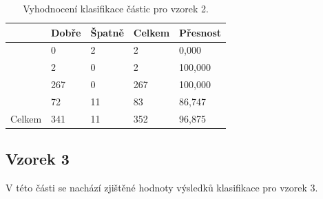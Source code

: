 \documentclass[11pt,twoside,a4paper,table]{book}
\begin{document}
\begin{table}[h]
\begin{center}
\begin{tabular}{lllll}
\rowcolor[HTML]{9B9B9B} 
\multicolumn{1}{|l|}{\cellcolor[HTML]{9B9B9B}Třída} & \multicolumn{1}{l|}{\cellcolor[HTML]{9B9B9B}Dobře} & \multicolumn{1}{l|}{\cellcolor[HTML]{9B9B9B}Špatně}  & \multicolumn{1}{l|}{\cellcolor[HTML]{9B9B9B}Celkem} & \multicolumn{1}{l|}{\cellcolor[HTML]{9B9B9B}Přesnost} \\ \hline
\multicolumn{1}{|l|}{}                              & \multicolumn{1}{l|}{0}                             & \multicolumn{1}{l|}{2}                               & \multicolumn{1}{l|}{2}                              & \multicolumn{1}{l|}{0,000}                            \\ \hline
\multicolumn{1}{|l|}{}                              & \multicolumn{1}{l|}{2}                             & \multicolumn{1}{l|}{0}                               & \multicolumn{1}{l|}{2}                              & \multicolumn{1}{l|}{100,000}                          \\ \hline
\multicolumn{1}{|l|}{}                              & \multicolumn{1}{l|}{267}                           & \multicolumn{1}{l|}{0}                               & \multicolumn{1}{l|}{267}                            & \multicolumn{1}{l|}{100,000}                          \\ \hline
\multicolumn{1}{|l|}{}                              & \multicolumn{1}{l|}{72}                            & \multicolumn{1}{l|}{11}                              & \multicolumn{1}{l|}{83}                             & \multicolumn{1}{l|}{86,747}                           \\ \hline
\multicolumn{1}{|l|}{Celkem}                        & \multicolumn{1}{l|}{341}                           & \multicolumn{1}{l|}{11}                              & \multicolumn{1}{l|}{352}                            & \multicolumn{1}{l|}{96,875}                           \\ \hline
\end{tabular}
\end{center}
\caption{Vyhodnocení klasifikace částic pro vzorek 2.}
\label{tab:classresult2}
\end{table}

\FloatBarrier
\subsection{Vzorek 3}
V této části se nachází zjištěné hodnoty výsledků klasifikace pro vzorek 3.
\end{document}
